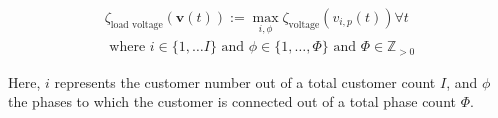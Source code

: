 \begin{equation}
\begin{split}
	\zeta_\text{load voltage}(\textbf{v}(t)) := \max_{i,\phi}{\zeta_\text{voltage}(v_{i,p}(t))} \forall t \\
	\text{ where } i \in \{1, \dots I\} \text{ and } \phi \in \{1, \dots, \Phi\} \text{ and } \Phi \in \mathbb{Z}_{>0}
\end{split}
\label{ch1:equ:load-voltage-deviation}
\end{equation}

Here, $i$ represents the customer number out of a total customer count $I$, and $\phi$ the phases to which the customer is connected out of a total phase count $\Phi$.
